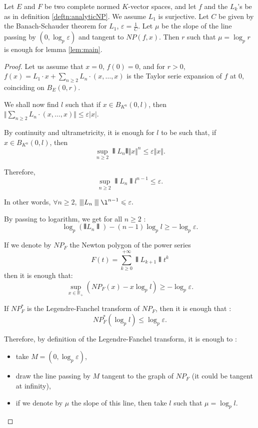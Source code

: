 \documentclass{lms}
\begin{document}
\begin{prop}\label{prop:locanalytic}
Let $E$ and $F$ be two complete normed $K$-vector spaces, and let $f$ and the $L_k$'s be as in definition \ref{deftn:analyticNP}. We assume $L_1$ is surjective. 
Let $C$ be given by the Banach-Schauder theorem for $L_1$, $\varepsilon = \frac{1}{C}$. 
Let $\mu$ be the slope of the line passing by $(0, \log_p \varepsilon)$ and tangent to $NP(f,x)$.
Then $r$ such that $\mu=\log_p r$ is enough for lemma \ref{lem:main}.
\end{prop}
\begin{proof}
Let us assume that $x=0$, $f(0)=0$, and for $r>0$, $f(x)=L_1 \cdot x +\sum_{n \geq 2} L_n \cdot (x, \dots,x)$ is the Taylor serie expansion of $f$ at $0$, coinciding on $B_E (0,r)$.

We shall now find $l$ such that if $x \in B_{K^n}(0,l)$, then $\Vert \sum_{n \geq 2} L_n \cdot (x,\dots,x) \Vert \leq \varepsilon \vert x \vert $.

By continuity and ultrametricity, it is enough for $l$ to be such that, if $x \in B_{K^n}(0,l)$, then  \[ \sup_{n \geq 2} \interleave L_n \interleave \Vert x \Vert^n \leq \varepsilon \Vert x \Vert .\] 

Therefore, \[ \sup_{n \geq 2} \interleave L_n \interleave l^{n-1}  \leq \varepsilon . \] 

In other words, $\forall n \geq 2$, $\interleave L_n \interleave \l^{n-1}  \leq \varepsilon.$

By passing to logarithm, we get for all $n \geq 2$ : \[ \log_p (\interleave L_n \interleave )-(n-1) \log_p l \geq - \log_p \varepsilon.\]

If we denote by $NP_F$ the Newton polygon of the power series 
\[
F(t) = \sum_{k\geq 0}^{+\infty} \interleave L_{k+1} \interleave  t^k
\]
then it is enough that:
\[
\sup_{ x \in \mathbb{R}_+} \left( NP_F(x) -x  \log_p l \right) \geq - \log_p \varepsilon.
\]

If $NP_F^*$ is the Legendre-Fanchel transform of $NP_F$, then it is enough that :
\[ NP_F^* \left( \log_p l  \right) \leq \log_p \varepsilon.\]

Therefore, by definition of the Legendre-Fanchel transform, it is enough to :
\begin{itemize}
\item take $M=(0,\log_p \varepsilon)$,
\item draw the line passing by $M$ tangent to the graph of $NP_F$ (it could be tangent at infinity),
\item if we denote by $\mu$ the slope of this line, then take $l$ such that $\mu=\log_p l$.
\end{itemize}
\end{proof}
\end{document}
